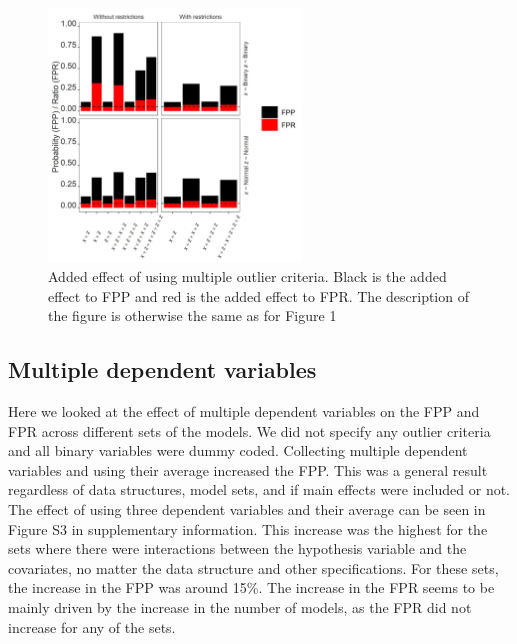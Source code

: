 \begin{figure}[t]
\includegraphics[width=0.6\textwidth]{R/Analysis/Result/Figures/Figure1B.jpeg}
\centering
\caption{Added effect of using multiple outlier criteria. Black is the added effect to FPP and red is the added effect to FPR.  The description of the figure is otherwise the same as for Figure 1}
\label{fig:mainfigure}
\end{figure}

\subsection{Multiple dependent variables}
Here we looked at the effect of multiple dependent variables on the FPP and FPR across different sets of the models. We did not specify any outlier criteria and all binary variables were dummy coded. Collecting multiple dependent variables and using their average increased the FPP. This was a general result regardless of data structures, model sets, and if main effects were included or not. The effect of using three dependent variables and their average can be seen in Figure S3 in supplementary information. This increase was the highest for the sets where there were interactions between the hypothesis variable and the covariates, no matter the data structure and other specifications. For these sets, the increase in the FPP was around 15\%. The increase in the FPR seems to be mainly driven by the increase in the number of models, as the FPR did not increase for any of the sets. 

